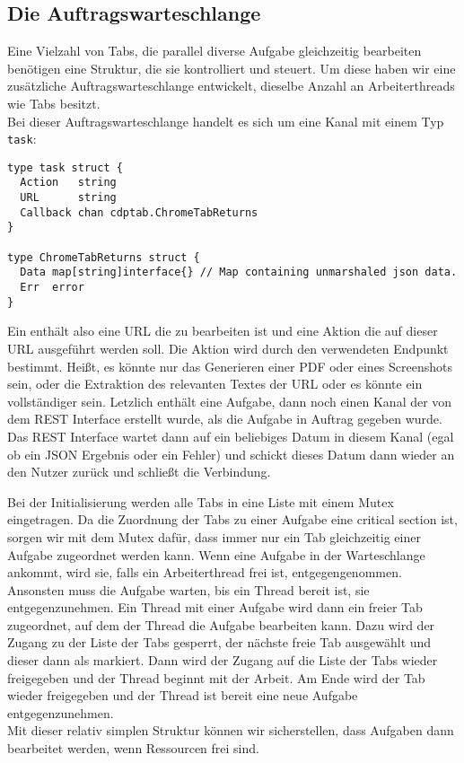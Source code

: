 \subsection{Die Auftragswarteschlange}
Eine Vielzahl von Tabs, die parallel diverse Aufgabe gleichzeitig bearbeiten benötigen eine Struktur, die sie kontrolliert und steuert. Um diese haben wir eine zusätzliche Auftragswarteschlange entwickelt, dieselbe Anzahl an Arbeiterthreads wie Tabs besitzt. \\
Bei dieser Auftragswarteschlange handelt es sich um eine Kanal mit einem Typ \verb|task|:
\begin{verbatim}
type task struct {
  Action   string
  URL      string
  Callback chan cdptab.ChromeTabReturns
}

type ChromeTabReturns struct {
  Data map[string]interface{} // Map containing unmarshaled json data.
  Err  error
}
\end{verbatim}
Ein  enthält also eine URL die zu bearbeiten ist und eine Aktion die auf dieser URL ausgeführt werden soll. Die Aktion wird durch den verwendeten Endpunkt bestimmt. Heißt, es könnte nur das Generieren einer PDF oder eines Screenshots sein, oder die Extraktion des relevanten Textes der URL oder es könnte ein vollständiger  sein. Letzlich enthält eine Aufgabe, dann noch einen Kanal der von dem REST Interface erstellt wurde, als die Aufgabe in Auftrag gegeben wurde. Das REST Interface wartet dann auf ein beliebiges Datum in diesem Kanal (egal ob ein JSON Ergebnis oder ein Fehler) und schickt dieses Datum dann wieder an den Nutzer zurück und schließt die Verbindung. 

Bei der Initialisierung werden alle Tabs in eine Liste mit einem Mutex eingetragen. Da die Zuordnung der Tabs zu einer Aufgabe eine critical section ist, sorgen wir mit dem Mutex dafür, dass immer nur ein Tab gleichzeitig einer Aufgabe zugeordnet werden kann. Wenn eine Aufgabe in der Warteschlange ankommt, wird sie, falls ein Arbeiterthread frei ist, entgegengenommen. Ansonsten muss die Aufgabe warten, bis ein Thread bereit ist, sie entgegenzunehmen. Ein Thread mit einer Aufgabe wird dann ein freier Tab zugeordnet, auf dem der Thread die Aufgabe bearbeiten kann. Dazu wird der Zugang zu der Liste der Tabs gesperrt, der nächste freie Tab ausgewählt und dieser dann als  markiert. Dann wird der Zugang auf die Liste der Tabs wieder freigegeben und der Thread beginnt mit der Arbeit. Am Ende wird der Tab wieder freigegeben und der Thread ist bereit eine neue Aufgabe entgegenzunehmen. \\ Mit dieser relativ simplen Struktur können wir sicherstellen, dass Aufgaben dann bearbeitet werden, wenn Ressourcen frei sind.

